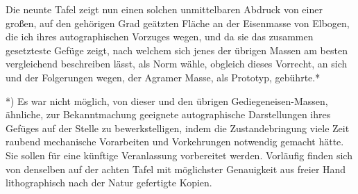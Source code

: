 \documentclass[a4paper, 11pt, oneside, german]{article}
\begin{document}
Die neunte Tafel zeigt nun einen solchen unmittelbaren Abdruck von einer großen, auf den gehörigen Grad geätzten Fläche an der Eisenmasse von Elbogen, die ich ihres autographischen Vorzuges wegen, und da sie das zusammen gesetzteste Gefüge zeigt, nach welchem sich jenes der übrigen Massen am besten vergleichend beschreiben lässt, als Norm wähle, obgleich dieses Vorrecht, an sich und der Folgerungen wegen, der Agramer Masse, als Prototyp, gebührte.*

*) Es war nicht möglich, von dieser und den übrigen Gediegeneisen-Massen, ähnliche, zur Bekanntmachung geeignete autographische Darstellungen ihres Gefüges auf der Stelle zu bewerkstelligen, indem die Zustandebringung viele Zeit raubend mechanische Vorarbeiten und Vorkehrungen notwendig gemacht hätte. Sie sollen für eine künftige Veranlassung vorbereitet werden. Vorläufig finden sich von denselben auf der achten Tafel mit möglichster Genauigkeit aus freier Hand lithographisch nach der Natur gefertigte Kopien.
\end{document}
